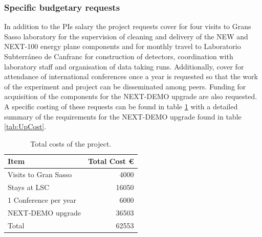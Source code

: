 \documentclass[a4paper,11pt,oneside]{article}
\begin{document}
\subsubsection*{Specific budgetary requests}
In addition to the PIs salary the project requests cover for four visits to
Grans Sasso laboratory for the supervision of cleaning and delivery of
the NEW and NEXT-100 energy plane components and for monthly travel to
Laboratorio Subterr\'aneo de Canfranc  for construction of detectors,
coordination with laboratory staff and organisation of data taking
runs. Additionally, cover for attendance of international conferences
once a year is requested so that the work of the experiment and
project can be disseminated among peers. Funding for acquisition of
the components for the NEXT-DEMO upgrade are also requested. A specific costing of these requests can be found in
table \ref{tab:TCOSTS} with a detailed summary of the requirements for
the NEXT-DEMO upgrade found in table \ref{tab:UpCost}.
\begin{table}[!h]
  \begin{center}
    \begin{tabular}{|l|r|}
      \hline
      Item              & Total Cost \euro  \\
      \hline
      Visits to Gran Sasso & 4000\\
      Stays at LSC & 16050\\
      1 Conference per year & 6000\\
      NEXT-DEMO upgrade & 36503 \\
      \hline
      Total        &  62553\\
      \hline
    \end{tabular}  
    \caption{Total costs of the project.}
    \label{tab:TCOSTS}
  \end{center}
\end{table}
\end{document}
